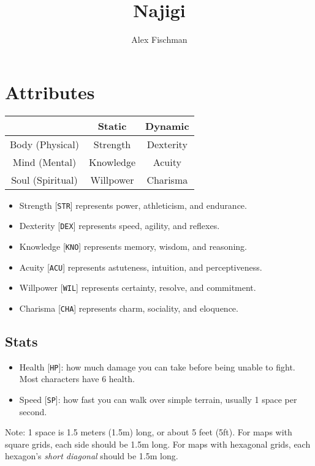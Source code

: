 \documentclass[12pt]{article}
\title{Najigi}
\author{Alex Fischman}
\newcommand{\STR}{\texttt{STR}}
\newcommand{\DEX}{\texttt{DEX}}
\newcommand{\KNO}{\texttt{KNO}}
\newcommand{\ACU}{\texttt{ACU}}
\newcommand{\WIL}{\texttt{WIL}}
\newcommand{\CHA}{\texttt{CHA}}
\newcommand{\HP}{\texttt{HP}}
\newcommand{\SP}{\texttt{SP}}
\begin{document}
\maketitle
\tableofcontents
\clearpage

\pagebreak
\section{Attributes}

\begin{tabularx}{\textwidth}{C|C C}
& Static & Dynamic \\\hline
Body (Physical) & Strength & Dexterity \\
Mind (Mental) & Knowledge & Acuity \\
Soul (Spiritual) & Willpower & Charisma
\end{tabularx}

\begin{itemize}
\item Strength [\STR] represents power, athleticism, and endurance.
\item Dexterity [\DEX] represents speed, agility, and reflexes.
\item Knowledge [\KNO] represents memory, wisdom, and reasoning.
\item Acuity [\ACU] represents astuteness, intuition, and perceptiveness.
\item Willpower [\WIL] represents certainty, resolve, and commitment.
\item Charisma [\CHA] represents charm, sociality, and eloquence.
\end{itemize}

\subsection{Stats}

\begin{itemize}
\item Health [\HP]: how much damage you can take before being unable to fight. Most characters have 6 health.
\item Speed [\SP]: how fast you can walk over simple terrain, usually 1 space per second.
\end{itemize}

Note: 1 space is 1.5 meters (1.5m) long, or about 5 feet (5ft). For maps with square grids, each side should be 1.5m long. For maps with hexagonal grids, each hexagon’s \textit{short diagonal} should be 1.5m long.
\end{document}
